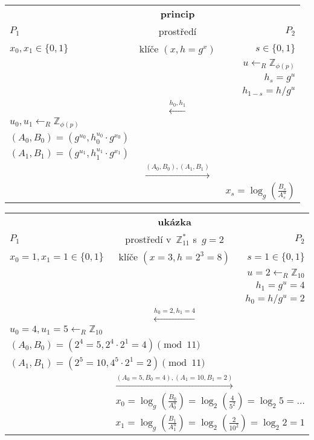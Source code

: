 \begin{table}[ht]
    \centering
    \begin{tabular}{lcr}
    & \textbf{princip} & \\
    $P_1$ & prostředí & $P_2$ \\
    $x_0, x_1 \in \{0,1\}$ & klíče $(x, h = g^x)$ & $s \in \{0,1\}$ \\
    \hline
    & & $u \leftarrow_R \mathbb{Z}_{\phi(p)}$ \\
    & & $h_s = g^u$ \\
    & & $h_{1-s} = h / g^u$ \\
    & $\stackrel{h_0, h_1}{\longleftarrow}$ & \\
    $u_0, u_1 \leftarrow_R \mathbb{Z}_{\phi(p)}$ & & \\
    $(A_0, B_0) = (g^{u_0}, h_0^{u_0} \cdot g^{x_0})$ & & \\
    $(A_1, B_1) = (g^{u_1}, h_1^{u_1} \cdot g^{x_1})$ & & \\
    & $\stackrel{(A_0, B_0), (A_1, B_1)}{\longrightarrow}$ & \\
    & & $x_s = \log_g \left( \frac{B_s}{A_s^u} \right)$
    \end{tabular}

    \vspace*{3em}

    \begin{tabular}{lcr}
    & \textbf{ukázka} & \\
    $P_1$ & prostředí v~$\mathbb{Z}_{11}^*$ s~$g=2$ & $P_2$ \\
    $x_0 = 1, x_1 = 1 \in \{0,1\}$ & klíče $(x = 3, h = 2^3 = 8)$ & $s = 1\in \{0,1\}$ \\
    \hline
    & & $u = 2 \leftarrow_R \mathbb{Z}_{10}$ \\
    & & $h_1 = g^u = 4$ \\
    & & $h_0 = h / g^u = 2$ \\
    & $\stackrel{h_0 = 2, h_1 = 4}{\longleftarrow}$ & \\
    $u_0 = 4, u_1 = 5 \leftarrow_R \mathbb{Z}_{10}$ & & \\
    \multicolumn{2}{l}{$(A_0, B_0) = (2^{4} = 5, 2^{4} \cdot 2^{1} = 4) \pmod {11}$} & \\
    \multicolumn{2}{l}{$(A_1, B_1) = (2^{5} = 10, 4^{5} \cdot 2^{1} = 2) \pmod {11}$} & \\
    & $\stackrel{(A_0 = 5, B_0 = 4), (A_1 = 10, B_1 = 2)}{\longrightarrow}$ & \\
    & \multicolumn{2}{r}{$x_0 = \log_g \left( \frac{B_0}{A_0^u} \right) = \log_2 \left( \frac{4}{5^2} \right) = \log_2 5 = \dots$} \\
    & \multicolumn{2}{r}{$x_1 = \log_g \left( \frac{B_1}{A_1^u} \right) = \log_2 \left( \frac{2}{10^2} \right) = \log_2 2 = 1$} \\
    \end{tabular}
    \label{fig:ot-elgamal}
\end{table}
\FloatBarrier


